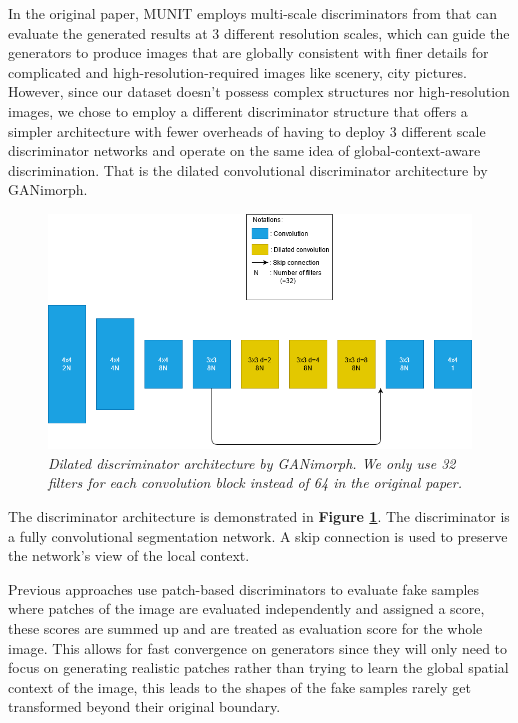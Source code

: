\documentclass[12pt]{report}
\begin{document}
In the original paper, MUNIT \cite{munit} employs multi-scale discriminators from \cite{multi-scale-discri} that can evaluate the generated results at 3 different resolution scales, which can guide the generators to produce images that are globally consistent with finer details for complicated and high-resolution-required images like scenery, city pictures. However, since our dataset doesn't possess complex structures nor high-resolution images, we chose to employ a different discriminator structure that offers a simpler architecture with fewer overheads of having to deploy 3 different scale discriminator networks and operate on the same idea of global-context-aware discrimination. That is the dilated convolutional discriminator architecture by GANimorph\cite{ganimorph}.

\begin{figure}[h]
	\centering
	\includegraphics[scale=0.6]{discri-architecture}
	\caption{\textit{Dilated discriminator architecture by GANimorph\cite{ganimorph}. We only use 32 filters for each convolution block instead of 64 in the original paper.}}
	\label{fig:discri-architecture}
\end{figure}

The discriminator architecture is demonstrated in \textbf{Figure \ref{fig:discri-architecture}}. The discriminator is a fully convolutional segmentation network. A skip connection is used to preserve the network's view of the local context.

Previous approaches \cite{cycle-gan}\cite{disco-gan} use patch-based discriminators to evaluate fake samples where patches of the image are evaluated independently and assigned a score, these scores are summed up and are treated as evaluation score for the whole image. This allows for fast convergence on generators since they will only need to focus on generating realistic patches rather than trying to learn the global spatial context of the image, this leads to the shapes of the fake samples rarely get transformed beyond their original boundary.
\end{document}
